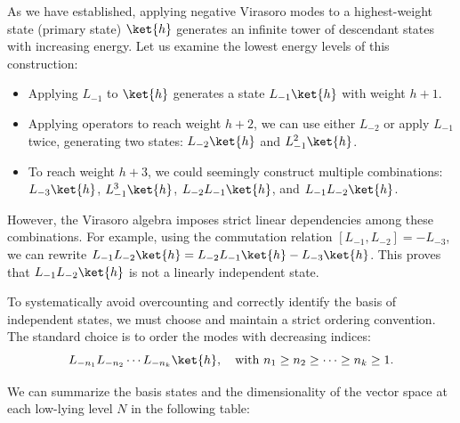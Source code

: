 As we have established, applying negative Virasoro modes to a highest-weight state (primary state) \(\ket{h}\) generates an infinite tower of descendant states with increasing energy. Let us examine the lowest energy levels of this construction:
\begin{itemize}
    \item Applying \(L_{-1}\) to \(\ket{h}\) generates a state \(L_{-1}\ket{h}\) with weight \(h+1\).
    \item Applying operators to reach weight \(h+2\), we can use either \(L_{-2}\) or apply \(L_{-1}\) twice, generating two states: \(L_{-2}\ket{h}\) and \(L_{-1}^2\ket{h}\).
    \item To reach weight \(h+3\), we could seemingly construct multiple combinations: \(L_{-3}\ket{h}\), \(L_{-1}^3\ket{h}\), \(L_{-2}L_{-1}\ket{h}\), and \(L_{-1}L_{-2}\ket{h}\).
\end{itemize}
However, the Virasoro algebra imposes strict linear dependencies among these combinations. For example, using the commutation relation \([L_{-1}, L_{-2}] = -L_{-3}\), we can rewrite \(L_{-1}L_{-2}\ket{h} = L_{-2}L_{-1}\ket{h} - L_{-3}\ket{h}\). This proves that \(L_{-1}L_{-2}\ket{h}\) is not a linearly independent state.

To systematically avoid overcounting and correctly identify the basis of independent states, we must choose and maintain a strict ordering convention. The standard choice is to order the modes with decreasing indices:
\[
    L_{-n_1} L_{-n_2} \cdots L_{-n_k} \ket{h}, \quad \text{with } n_1 \ge n_2 \ge \cdots \ge n_k \ge 1.
\]

We can summarize the basis states and the dimensionality of the vector space at each low-lying level \(N\) in the following table:

